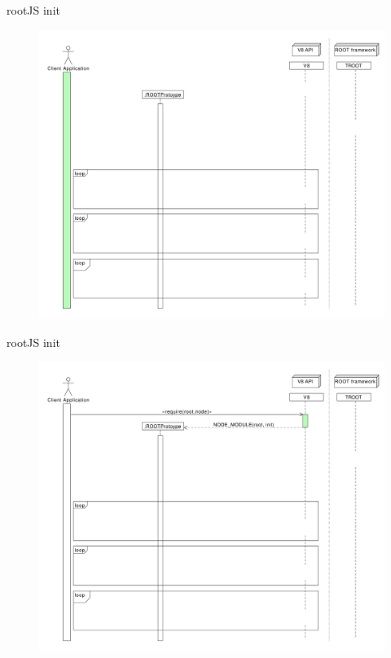 \begin{frame}{rootJS init}
  \begin{figure}[htb]
    \centering
      \includegraphics[width=\textwidth, height=.85\textheight, keepaspectratio]{./resources/initialize/initialize_h1.pdf}
  \end{figure}
\end{frame}

\begin{frame}{rootJS init}
  \begin{figure}[htb]
    \centering
      \includegraphics[width=\textwidth, height=.85\textheight, keepaspectratio]{./resources/initialize/initialize_h2.pdf}
  \end{figure}
\end{frame}

